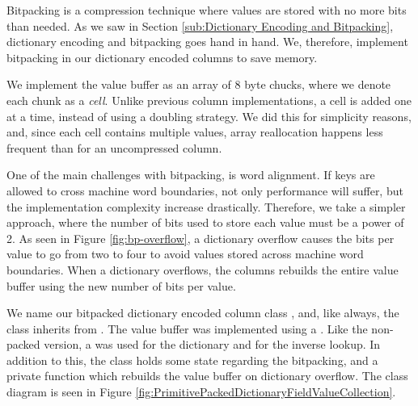 Bitpacking is a compression technique where values are stored with no more bits than needed. As we saw in Section \ref{sub:Dictionary Encoding and Bitpacking}, dictionary encoding and bitpacking goes hand in hand. We, therefore, implement bitpacking in our dictionary encoded columns to save memory.

We implement the value buffer as an array of 8 byte chucks, where we denote each chunk as a \textit{cell}. Unlike previous column implementations, a cell is added one at a time, instead of using a doubling strategy. We did this for simplicity reasons, and, since each cell contains multiple values, array reallocation happens less frequent than for an uncompressed column.

One of the main challenges with bitpacking, is word alignment. If keys are allowed to cross machine word boundaries, not only performance will suffer, but the implementation complexity increase drastically. Therefore, we take a simpler approach, where the number of bits used to store each value must be a power of 2. As seen in Figure \ref{fig:bp-overflow}, a dictionary overflow causes the bits per value to go from two to four to avoid values stored across machine word boundaries. When a dictionary overflows, the columns rebuilds the entire value buffer using the new number of bits per value.

We name our bitpacked dictionary encoded column class , and, like always, the class inherits from . The value buffer was implemented using a . Like the non-packed version, a  was used for the dictionary and  for the inverse lookup. In addition to this, the class holds some state regarding the bitpacking, and a private function  which rebuilds the value buffer on dictionary overflow. The class diagram is seen in Figure \ref{fig:PrimitivePackedDictionaryFieldValueCollection}.

